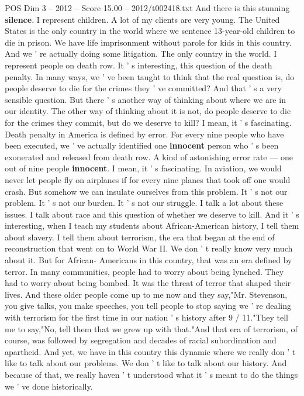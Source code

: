\begin{textsample}{POS Dim 3 – 2012 – Score 15.00 – 2012/t002418.txt}
And there is this stunning \textbf{silence}.
I represent children.
A lot of my clients are very young.
The United States is the only country in the world where we sentence 13-year-old children to die in prison.
We have life imprisonment without parole for kids in this country.
And we ' re actually doing some litigation.
The only country in the world.
I represent people on death row.
It ' s interesting, this question of the death penalty.
In many ways, we ' ve been taught to think that the real question is, do people deserve to die for the crimes they ' ve committed?
And that ' s a very sensible question.
But there ' s another way of thinking about where we are in our identity.
The other way of thinking about it is not, do people deserve to die for the crimes they commit, but do we deserve to kill?
I mean, it ' s fascinating.
Death penalty in America is defined by error.
For every nine people who have been executed, we ' ve actually identified one \textbf{innocent} person who ' s been exonerated and released from death row.
A kind of astonishing error rate — one out of nine people \textbf{innocent}.
I mean, it ' s fascinating.
In aviation, we would never let people fly on airplanes if for every nine planes that took off one would crash.
But somehow we can insulate ourselves from this problem.
It ' s not our problem.
It ' s not our burden.
It ' s not our struggle.
I talk a lot about these issues.
I talk about race and this question of whether we deserve to kill.
And it ' s interesting, when I teach my students about African-American history, I tell them about slavery.
I tell them about terrorism, the era that began at the end of reconstruction that went on to World War II.
We don ' t really know very much about it.
But for African- Americans in this country, that was an era defined by terror.
In many communities, people had to worry about being lynched.
They had to worry about being bombed.
It was the threat of terror that shaped their lives.
And these older people come up to me now and they say,"Mr.
Stevenson, you give talks, you make speeches, you tell people to stop saying we ' re dealing with terrorism for the first time in our nation ' s history after 9 / 11."They tell me to say,"No, tell them that we grew up with that."And that era of terrorism, of course, was followed by segregation and decades of racial subordination and apartheid.
And yet, we have in this country this dynamic where we really don ' t like to talk about our problems.
We don ' t like to talk about our history.
And because of that, we really haven ' t understood what it ' s meant to do the things we ' ve done historically.

\end{textsample}
